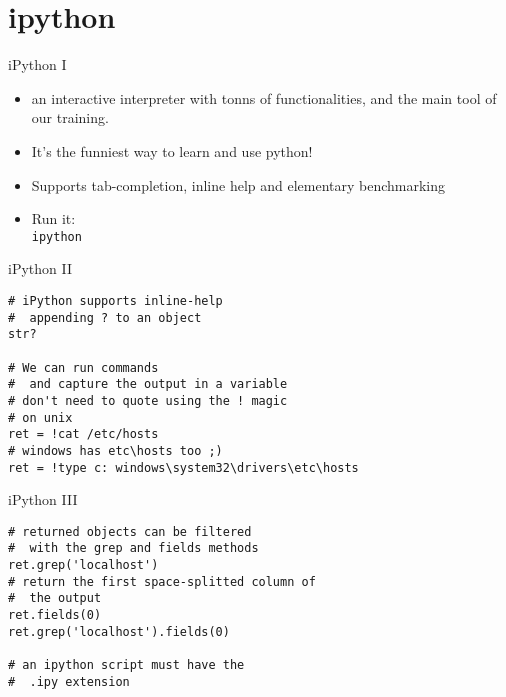 \section{ipython}



\begin{frame}{iPython I}
\begin{itemize}
\item an interactive interpreter with tonns of                                                                                                        functionalities, and the main tool of our training.                                                                                                      

\item   It's the funniest way to learn and use python!

\item   Supports tab-completion, inline help and elementary
    benchmarking

\item   Run it: \\
\texttt{ipython}
\end{itemize}

\end{frame}


\begin{frame}[fragile]{iPython II}
\begin{verbatim}
# iPython supports inline-help
#  appending ? to an object
str?

# We can run commands
#  and capture the output in a variable
# don't need to quote using the ! magic
# on unix
ret = !cat /etc/hosts
# windows has etc\hosts too ;)
ret = !type c: windows\system32\drivers\etc\hosts

\end{verbatim}
\end{frame}


\begin{frame}[fragile]{iPython III}
\begin{verbatim}
# returned objects can be filtered
#  with the grep and fields methods
ret.grep('localhost')
# return the first space-splitted column of
#  the output
ret.fields(0)
ret.grep('localhost').fields(0)

# an ipython script must have the 
#  .ipy extension
\end{verbatim}
\end{frame}

